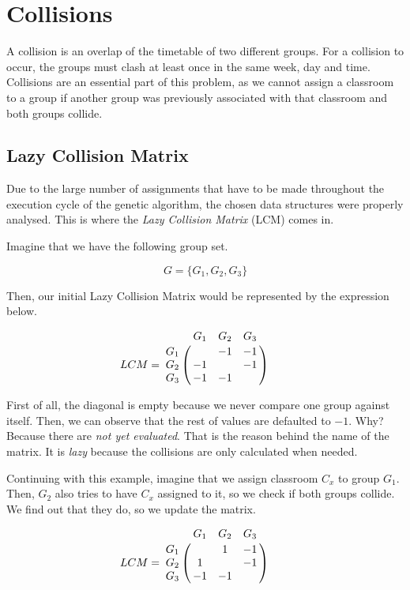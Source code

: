 \section{Collisions}

A collision is an overlap of the timetable of two different groups. For a collision to occur, the groups must clash at least once in the same week, day and time. Collisions are an essential part of this problem, as we cannot assign a classroom to a group if another group was previously associated with that classroom and both groups collide.

\subsection{Lazy Collision Matrix}\label{lcm}

Due to the large number of assignments that have to be made throughout the execution cycle of the genetic algorithm, the chosen data structures were properly analysed. This is where the \textit{Lazy Collision Matrix} (LCM) comes in.

Imagine that we have the following group set.

\begin{equation}
    G = \{ G_{1}, G_{2}, G_{3} \}
\end{equation}

Then, our initial Lazy Collision Matrix would be represented by the expression below.

\begin{equation}
    LCM = \bordermatrix{
        & G_{1} & G_{2} & G_{3} \cr
        G_{1} &  & -1 & -1 \cr
        G_{2} & -1 &  & -1 \cr
        G_{3} & -1 & -1 & 
    } \qquad
\end{equation}

First of all, the diagonal is empty because we never compare one group against itself. Then, we can observe that the rest of values are defaulted to $-1$. Why? Because there are \textit{not yet evaluated}. That is the reason behind the name of the matrix. It is \textit{lazy} because the collisions are only calculated when needed.

Continuing with this example, imagine that we assign classroom $C_{x}$ to group $G_{1}$. Then, $G_{2}$ also tries to have $C_{x}$ assigned to it, so we check if both groups collide. We find out that they do, so we update the matrix.

\begin{equation}
    LCM = \bordermatrix{
        & G_{1} & G_{2} & G_{3} \cr
        G_{1} &  & 1 & -1 \cr
        G_{2} & 1 &  & -1 \cr
        G_{3} & -1 & -1 & 
    } \qquad
\end{equation}

